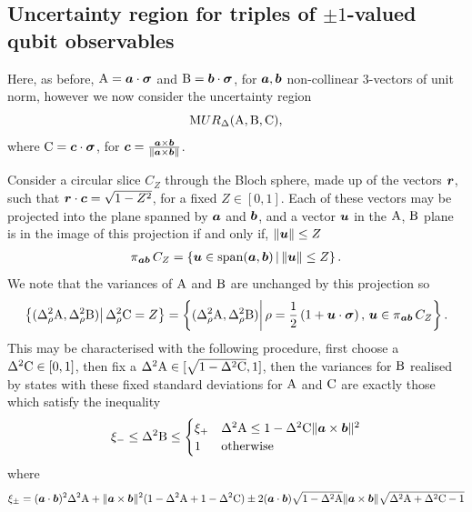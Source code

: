\subsection{Uncertainty region for triples of $\pm 1$-valued qubit observables}
\label{sec:qubit-triple-uncertainty}
Here, as before, $\operatorname{A} = \bm{a}\cdot{\boldsymbol\sigma}$ and $\operatorname{B} = \bm{b}\cdot{\boldsymbol\sigma}$, for $\bm{a}, \bm{b}$ non-collinear 3-vectors of unit norm, however we now consider the uncertainty region
\begin{equation}
  {\mathrm MUR}_\Delta(\operatorname{A},\operatorname{B},\operatorname{C}),
\end{equation}
where $\operatorname{C} = \bm{c}\cdot{\boldsymbol\sigma}$, for $\bm{c} = \frac{\bm{a}\times\bm{b}}{\|\bm{a}\times\bm{b}\|}$.

Consider a circular slice $C_Z$ through the Bloch sphere, made up of the vectors $\bm{r}$, such that $\bm{r}\cdot\bm{c} = \sqrt{1-Z^2}$, for a fixed $Z\in[0,1]$. Each of these vectors may be projected into the plane spanned by $\bm{a}$ and $\bm{b}$, and a vector $\bm{u}$ in the $\operatorname{A}$, $\operatorname{B}$ plane is in the image of this projection if and only if, $\|\bm{u}\| \leq Z$
\begin{align}
  \operatorname{\pi}_{\bm{a}\bm{b}} C_Z = \left\{\bm{u}\in \operatorname{span}(\bm{a},\bm{b})\,\middle|\,\|\bm{u}\| \leq Z\right\}.
\end{align}
We note that the variances of $\operatorname{A}$ and $\operatorname{B}$ are unchanged by this projection so
\begin{align}
  \left\{(\varr{\opa}, \varr{\opb})\middle|\,\varr{\opc} = Z\right\} = \left\{(\varr{\opa}, \varr{\opb})\middle|\, \rho = \frac{1}{2}\left(1 + \bou\cdot\bosig\right),\, \bou\in\oppi_{\boa\bob}C_Z\right\}.
\end{align}
This may be characterised with the following procedure, first choose a $\var{\opc}\in[0,1]$, then fix a $\var{\opa}\in[\sqrt{1-\var{\opc}}, 1]$, then the variances for $\operatorname{B}$ realised by states with these fixed standard deviations for $\operatorname{A}$ and $\operatorname{C}$ are exactly those which satisfy the inequality
\begin{align}
  \xi_- \leq \var{\opb}   \leq\begin{cases}\xi_+ & \var{\opa} \leq 1-\var{\opc}\|\boa\times\bob\|^2\\1&\text{otherwise}\end{cases}
\end{align}
where
\begin{align}
  \xi_\pm = (\boa\cdot\bob)^2 \var{\opa} + \|\boa\times\bob\|^2(1-\var{\opa} + 1-\var{\opc}) \pm 2(\boa\cdot\bob)\sqrt{1-\var{\opa}}\|\boa\times\bob\|\sqrt{\var{\opa} + \var{\opc} -1}
\end{align}

